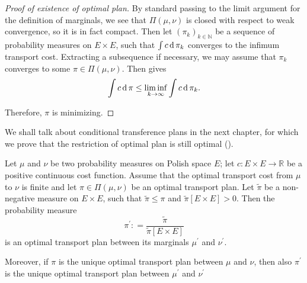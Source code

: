 \begin{proof}[Proof of existence of optimal plan]
	By standard passing to the limit argument for the definition of marginals,
	we see that \( \Pi ( \mu , \nu ) \) is closed with respect to weak convergence,
	so it is in fact compact.
	Then let \( \left( \pi _ { k } \right) _ { k \in \mathbb{ N } } \) be a sequence of probability measures on \( E \times E \),
	such that \( \int c \operatorname{d} \pi _ { k } \) converges to the infimum transport cost.
	Extracting a subsequence if necessary, we may assume that \( \pi _ { k } \) converges to some \( \pi \in \Pi ( \mu , \nu ) \).
	Then  gives
	\[ \int c \operatorname{d} \pi \leq \liminf _ { k \rightarrow \infty } \int c \operatorname{d} \pi _ { k }. \]

	Therefore, $\pi$ is minimizing.
\end{proof}

We shall talk about conditional transference plans in the next chapter,
for which we prove that the restriction of optimal plan is still optimal (\cite[Theorem 4.6]{villani2008optimal}).

\begin{thm}
	\label{thm:restriction_optimal_plan}
	Let \(  \mu  \) and \(  \nu \) be two probability measures on Polish space $E$;
	let \( c : E \times E \rightarrow \mathbb{ R } \) be a positive continuous cost function.
	Assume that the optimal transport cost from \( \mu \) to \( \nu \) is finite
	and let \( \pi \in \Pi ( \mu , \nu ) \) be an optimal transport plan.
	Let \( \widetilde { \pi } \) be a non-negative measure on \( E \times E \),
	such that \( \widetilde { \pi } \leq \pi \)
	and \( \widetilde { \pi } [ E \times E ] > 0\).
	Then the probability measure
	\[ \pi ^ { \prime } : = \frac { \widetilde { \pi } } { \widetilde { \pi } [ E \times E ] } \]
	is an optimal transport plan between its marginals \( \mu ^ { \prime } \) and \( \nu ^ { \prime } \).

	Moreover, if \( \pi \) is the unique optimal transport plan between \( \mu \)
	and \( \nu \),
	then also \( \pi ^ { \prime } \) is the unique optimal transport plan between \( \mu ^ { \prime } \)
	and \( \nu ^ { \prime } \)
\end{thm}

